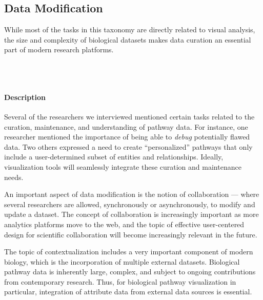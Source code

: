 \documentclass[twocolumn]{bmcart}%
\begin{document}
\subsection*{Data Modification}

While most of the tasks in this taxonomy are directly related to visual analysis, the size and complexity of biological datasets makes data curation an essential part of modern research platforms.

\ \\ \
\paragraph*{Description}

Several of the researchers we interviewed mentioned certain tasks related to the curation, maintenance, and understanding of pathway data.
For instance, one researcher mentioned the importance of being able to \emph{debug} potentially flawed data.
Two others expressed a need to create ``personalized'' pathways that only include a user-determined subset of entities and relationships.
Ideally, visualization tools will seamlessly integrate these curation and maintenance needs.

An important aspect of data modification is the notion of collaboration --- where several researchers are allowed, synchronously or asynchronously, to modify and update a dataset.
The concept of collaboration is increasingly important as more analytics platforms move to the web, and the topic of effective user-centered design for scientific collaboration will become increasingly relevant in the future.

The topic of contextualization includes a very important component of modern biology, which is the incorporation of multiple external datasets.
Biological pathway data is inherently large, complex, and subject to ongoing contributions from contemporary research.
Thus, for biological pathway visualization in particular, integration of attribute data from external data sources is essential.
\end{document}
